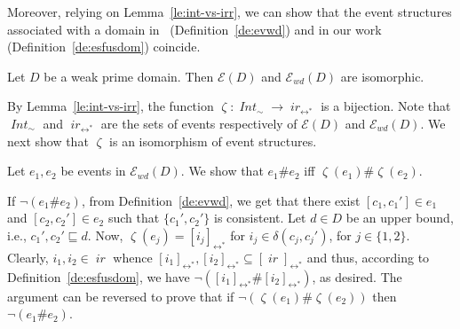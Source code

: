 \documentclass[conference]{IEEEtran}
\renewenvironment{proof}{\begin{IEEEproof}}{\end{IEEEproof}}
\newcommand{\ir}[1]{\ensuremath{\mathop{\mathit{ir}({#1})}}}
\newcommand{\diff}[2]{\ensuremath{\delta({#1},{#2})}}
\newcommand{\eqclass}[2][]{\ensuremath{[{#2}]_{\scriptscriptstyle {#1}}}}
\newcommand{\eqclassir}[1]{\ensuremath{\eqclass[\leftrightarrow^*]{#1}}}
\newcommand{\quotient}[2]{\ensuremath{{#1}_{\scriptscriptstyle {#2}}}}
\newcommand{\zev}[0]{\ensuremath{\mathcal{E}}}
\newcommand{\ev}[1]{\ensuremath{\zev({#1})}}
\newcommand{\zevwd}[0]{\ensuremath{\mathcal{E}_{wd}}}
\newcommand{\evwd}[1]{\ensuremath{\zevwd({#1})}}
\newcommand{\dint}[2]{\ensuremath{[{#1},{#2}]}}
\newcommand{\IntSet}[1]{\ensuremath{\mathop{\mathit{Int}({#1})}}}
\newcommand{\inir}{\ensuremath{\mathop{\mathit{\zeta}}}}
\begin{document}
Moreover, relying on Lemma~\ref{le:int-vs-irr}, we can
show that the event structures associated with a domain
in~\cite{Dro:ESD} (Definition~\ref{de:evwd}) and in our work (Definition~\ref{de:esfusdom})
coincide.

\begin{proposition}
  \label{pr:es-int}
  Let $D$ be a weak prime domain. Then $\ev{D}$ and $\evwd{D}$ are isomorphic.
\end{proposition}

\begin{proof}
  By Lemma~\ref{le:int-vs-irr}, the function
  $\inir : \quotient{\IntSet{D}}{\sim} \to \quotient{\ir{D}}{\leftrightarrow^*}$ is a
  bijection. Note that $\quotient{\IntSet{D}}{\sim}$ and
  $\quotient{\ir{D}}{\leftrightarrow^*}$ are the sets of events respectively of
  $\ev{D}$ and $\evwd{D}$. We next show that $\inir$ is an isomorphism
  of event structures.

  \medskip

  Let $e_1, e_2$ be events in $\evwd{D}$. We show that $e_1 \# e_2$
  iff $\inir(e_1) \# \inir(e_2)$.
  
  If $\neg (e_1 \# e_2)$, from Definition~\ref{de:evwd}, we get that
  there exist $\dint{c_1}{c_1'} \in e_1$ and
  $\dint{c_2}{c_2'} \in e_2$ such that $\{ c_1', c_2' \}$ is
  consistent. Let $d \in D$ be an upper bound, i.e.,
  $c_1', c_2' \sqsubseteq d$. Now, $\inir(e_j) = \eqclassir{i_j}$ for
  $i_j \in \diff{c_j}{c_j'}$, for $j \in \{1,2\}$. Clearly,
  $i_1, i_2 \in \ir{d}$ whence
  $\eqclassir{i_1}, \eqclassir{i_2} \subseteq \eqclassir{\ir{d}}$ and
  thus, according to Definition~\ref{de:esfusdom}, we have
  $\neg (\eqclassir{i_1} \# \eqclassir{i_2})$, as desired.
  The argument can be reversed to prove that if
  $\neg( \inir(e_1) \# \inir(e_2) )$ then $\neg (e_1 \# e_2)$.
  
  \medskip
  

\end{proof}
\end{document}
